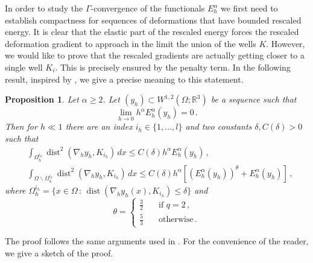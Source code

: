 \documentclass{article}
\theoremstyle{plain}
\theoremstyle{plain}
\theoremstyle{plain}
\theoremstyle{plain}
\theoremstyle{plain}
\newtheorem{prop}[teo]{Proposition}
\theoremstyle{definition}
\theoremstyle{definition}
\renewcommand{\r}{\mathbb{R}}
\DeclareMathOperator{\dist}{dist}
\begin{document}
In order to study the $\Gamma$-convergence of the functionals $E_h^\alpha$ we first need to establish compactness for sequences of deformations that have bounded rescaled energy. It is clear that the elastic part of the rescaled energy forces the rescaled deformation gradient to approach in the limit the union of the wells $K$. However, we would like to prove that the rescaled gradients are actually getting closer to a single well $K_i$. This is precisely ensured by the penalty term. In the following result, inspired by \cite{ALICANDRO2018}, we give a precise meaning to this statement.

\begin{prop}\label{prop:compactness}
    Let $\alpha \geq 2$. Let $(y_h) \subset W^{1,2}(\Omega; \r^3)$ be a sequence such that
    \begin{equation}
        \lim_{h \to 0} h^\alpha E^\alpha_h(y_h) = 0 \label{eq:hypothesis_compactness}\,.
    \end{equation}
    Then for $h \ll 1$ there are an index $i_h \in \{1, \dots, l\}$ and two constants $\delta, C(\delta) > 0$ such that
    \begin{align}
        & \int_{\Omega_{h}^{i_{h}}} \dist^2(\nabla_h y_h, K_{i_h}) \, dx \leq C(\delta)h^\alpha E^\alpha_h(y_h) \label{eq:compactness_near_well} \,,\\
        & \int_{\Omega \backslash \Omega_h^{i_h}} \dist^2(\nabla_h y_h, K_{i_h}) \, dx \leq C(\delta)h^\alpha[{(E^\alpha_h(y_h))}^{\theta} + E^\alpha_h(y_h)] \label{eq:compactness_far_well}\,,
    \end{align}
    where $\Omega_h^{i_h} = \{x \in \Omega \, : \, \dist(\nabla_h y_h(x), K_{i_h}) \leq \delta \}$ and
    \begin{equation}\label{eq:theta}
        \theta = \begin{cases}
            \frac{3}{2} \quad & \text{if} \, \, q = 2 \,,\\
            \frac{5}{3} \quad & \text{otherwise} \,.
        \end{cases}
    \end{equation}
\end{prop}

The proof follows the same arguments used in \cite[Theorem 2.3]{ALICANDRO2018}. For the convenience of the reader, we give a sketch of the proof.
\end{document}
